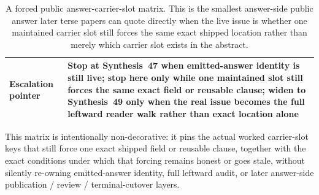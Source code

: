 \documentclass[11pt]{article}
\begin{document}
\begin{table}[t]
\begin{tabularx}{\linewidth}{@{}lX@{}}
Escalation pointer & Stop at Synthesis~47 when emitted-answer identity is still live; stop here only while one maintained slot still forces the same exact field or reusable clause; widen to Synthesis~49 only when the real issue becomes the full leftward reader walk rather than exact location alone \\
\bottomrule
\end{tabularx}
\caption{A forced public answer-carrier-slot matrix. This is the smallest answer-side public answer later terse papers can quote directly when the live issue is whether one maintained carrier slot still forces the same exact shipped location rather than merely which carrier slot exists in the abstract.}
\label{tab:forced-public-answer-carrier-slot-matrix}
\end{table}

This matrix is intentionally non-decorative: it pins the actual worked carrier-slot keys that still force one exact shipped field or reusable clause, together with the exact conditions under which that forcing remains honest or goes stale, without silently re-owning emitted-answer identity, full leftward audit, or later answer-side publication / review / terminal-cutover layers.\cite{series:workedexample}
\end{document}
